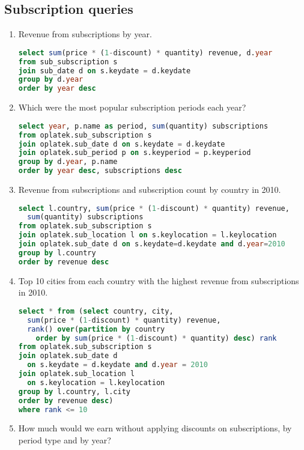 \subsection*{Subscription queries} %
\label{sub:Subscription business queries}
\begin{enumerate}
  \item Revenue from subscriptions by year.
\begin{lstlisting}[language=sql]
select sum(price * (1-discount) * quantity) revenue, d.year 
from sub_subscription s 
join sub_date d on s.keydate = d.keydate 
group by d.year 
order by year desc
\end{lstlisting}
  \item Which were the most popular subscription periods each year?
\begin{lstlisting}[language=sql]
select year, p.name as period, sum(quantity) subscriptions
from oplatek.sub_subscription s 
join oplatek.sub_date d on s.keydate = d.keydate
join oplatek.sub_period p on s.keyperiod = p.keyperiod 
group by d.year, p.name
order by year desc, subscriptions desc
\end{lstlisting}
  \item Revenue from subscriptions and subscription count by country in 2010.
\begin{lstlisting}[language=sql]
select l.country, sum(price * (1-discount) * quantity) revenue, 
  sum(quantity) subscriptions 
from oplatek.sub_subscription s 
join oplatek.sub_location l on s.keylocation = l.keylocation 
join oplatek.sub_date d on s.keydate=d.keydate and d.year=2010
group by l.country 
order by revenue desc
\end{lstlisting}
  \item Top 10 cities from each country with the highest revenue from subscriptions in 2010.
\begin{lstlisting}[language=sql]  
select * from (select country, city, 
  sum(price * (1-discount) * quantity) revenue, 
  rank() over(partition by country 
    order by sum(price * (1-discount) * quantity) desc) rank 
from oplatek.sub_subscription s 
join oplatek.sub_date d 
  on s.keydate = d.keydate and d.year = 2010
join oplatek.sub_location l 
  on s.keylocation = l.keylocation
group by l.country, l.city
order by revenue desc)
where rank <= 10
\end{lstlisting}
  \item How much would we earn without applying discounts on subscriptions, by period type and by year?
\begin{lstlisting}[language=sql] 

\end{lstlisting}
\end{enumerate}
